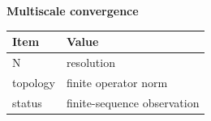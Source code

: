 \begin{center}
\textbf{Multiscale convergence}\par\smallskip
\begin{tabular}{ll}
\toprule
Item & Value \\
\midrule
N & resolution \\
topology & finite operator norm \\
status & finite-sequence observation \\
\bottomrule
\end{tabular}
\end{center}
